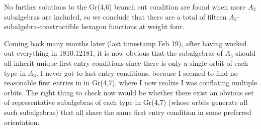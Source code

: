 \documentclass[12pt]{article}
\begin{document}
No further solutions to the Gr(4,6) branch cut condition are found when more $A_2$ subalgebras are included, so we conclude that there are a total of fifteen $A_2$-subalgebra-constructible hexagon functions at weight four.

\vspace{1cm}
Coming back many months later (last timestamp Feb 19), after having worked out everything in 1810.12181, it is now obvious that the subalgebras of $A_3$ should all inherit unique first-entry conditions since there is only a single orbit of each type in $A_3$. I never got to last entry conditions, because I seemed to find no reasonable first entries in in Gr(4,7), where I now realize I was conflating multiple orbits. The right thing to check now would be whether there exist an obvious set of representative subalgebras of each type in Gr(4,7) (whose orbits generate all such subalgebras) that all share the same first entry condition in some preferred orientation.
\end{document}
